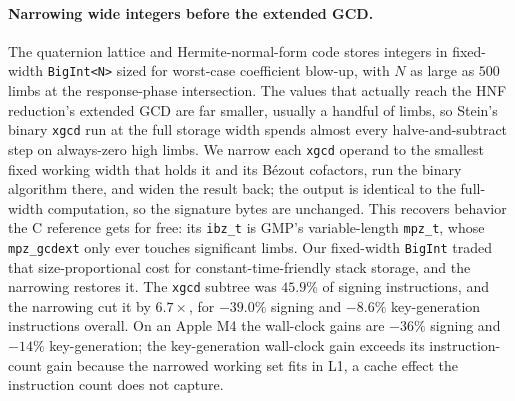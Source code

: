 \paragraph{Narrowing wide integers before the extended GCD.}
The quaternion lattice and Hermite-normal-form code stores integers in
fixed-width \texttt{BigInt<N>} sized for worst-case coefficient blow-up,
with $N$ as large as $500$ limbs at the response-phase intersection.  The
values that actually reach the HNF reduction's extended GCD are far
smaller, usually a handful of limbs, so Stein's binary \texttt{xgcd} run
at the full storage width spends almost every halve-and-subtract step on
always-zero high limbs.  We narrow each \texttt{xgcd} operand to the
smallest fixed working width that holds it and its B\'{e}zout cofactors,
run the binary algorithm there, and widen the result back; the output is
identical to the full-width computation, so the signature bytes are
unchanged.  This recovers behavior the C reference gets for free: its
\texttt{ibz\_t} is GMP's variable-length \texttt{mpz\_t}, whose
\texttt{mpz\_gcdext} only ever touches significant limbs.  Our fixed-width
\texttt{BigInt} traded that size-proportional cost for constant-time-friendly
stack storage, and the narrowing restores it.  The \texttt{xgcd} subtree
was $45.9\%$ of signing
instructions, and the narrowing cut it by $6.7\times$, for $-39.0\%$
signing and $-8.6\%$ key-generation instructions overall.  On an Apple M4
the wall-clock gains are $-36\%$ signing and $-14\%$ key-generation; the
key-generation wall-clock gain exceeds its instruction-count gain because
the narrowed working set fits in L1, a cache effect the instruction count
does not capture.

